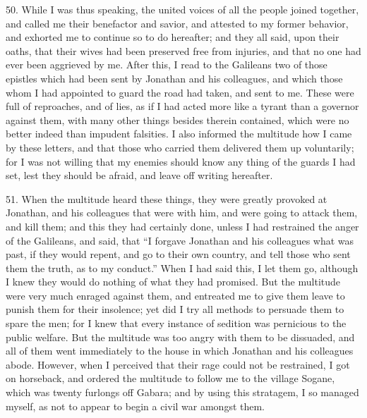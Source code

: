 50. While I was thus speaking, the united voices of all the people joined
together, and called me their benefactor and savior, and attested to my
former behavior, and exhorted me to continue so to do hereafter; and they
all said, upon their oaths, that their wives had been preserved free from
injuries, and that no one had ever been aggrieved by me. After this, I
read to the Galileans two of those epistles which had been sent by
Jonathan and his colleagues, and which those whom I had appointed to guard
the road had taken, and sent to me. These were full of reproaches, and of
lies, as if I had acted more like a tyrant than a governor against them,
with many other things besides therein contained, which were no better
indeed than impudent falsities. I also informed the multitude how I came
by these letters, and that those who carried them delivered them up
voluntarily; for I was not willing that my enemies should know any thing
of the guards I had set, lest they should be afraid, and leave off writing
hereafter.

51. When the multitude heard these things, they were greatly provoked at
Jonathan, and his colleagues that were with him, and were going to attack
them, and kill them; and this they had certainly done, unless I had
restrained the anger of the Galileans, and said, that ``I forgave Jonathan
and his colleagues what was past, if they would repent, and go to their
own country, and tell those who sent them the truth, as to my conduct.''
When I had said this, I let them go, although I knew they would do nothing
of what they had promised. But the multitude were very much enraged
against them, and entreated me to give them leave to punish them for their
insolence; yet did I try all methods to persuade them to spare the men;
for I knew that every instance of sedition was pernicious to the public
welfare. But the multitude was too angry with them to be dissuaded, and
all of them went immediately to the house in which Jonathan and his
colleagues abode. However, when I perceived that their rage could not be
restrained, I got on horseback, and ordered the multitude to follow me to
the village Sogane, which was twenty furlongs off Gabara; and by using
this stratagem, I so managed myself, as not to appear to begin a civil war
amongst them.

